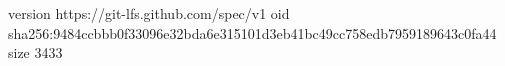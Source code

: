 version https://git-lfs.github.com/spec/v1
oid sha256:9484ccbbb0f33096e32bda6e315101d3eb41bc49cc758edb7959189643c0fa44
size 3433
